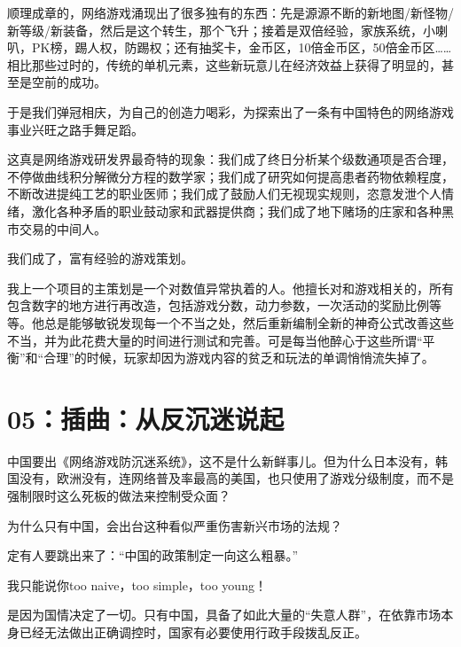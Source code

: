 \documentclass{article}
\begin{document}
顺理成章的，网络游戏涌现出了很多独有的东西：先是源源不断的新地图/新怪物/新等级/新装备，然后是这个转生，那个飞升；接着是双倍经验，家族系统，小喇叭，PK榜，踢人权，防踢权；还有抽奖卡，金币区，10倍金币区，50倍金币区……相比那些过时的，传统的单机元素，这些新玩意儿在经济效益上获得了明显的，甚至是空前的成功。



于是我们弹冠相庆，为自己的创造力喝彩，为探索出了一条有中国特色的网络游戏事业兴旺之路手舞足蹈。



这真是网络游戏研发界最奇特的现象：我们成了终日分析某个级数通项是否合理，不停做曲线积分解微分方程的数学家；我们成了研究如何提高患者药物依赖程度，不断改进提纯工艺的职业医师；我们成了鼓励人们无视现实规则，恣意发泄个人情绪，激化各种矛盾的职业鼓动家和武器提供商；我们成了地下赌场的庄家和各种黑市交易的中间人。



我们成了，富有经验的游戏策划。



我上一个项目的主策划是一个对数值异常执着的人。他擅长对和游戏相关的，所有包含数字的地方进行再改造，包括游戏分数，动力参数，一次活动的奖励比例等等。他总是能够敏锐发现每一个不当之处，然后重新编制全新的神奇公式改善这些不当，并为此花费大量的时间进行测试和完善。可是每当他醉心于这些所谓“平衡”和“合理”的时候，玩家却因为游戏内容的贫乏和玩法的单调悄悄流失掉了。





{\centering\section*{05：插曲：从反沉迷说起}}





中国要出《网络游戏防沉迷系统》，这不是什么新鲜事儿。但为什么日本没有，韩国没有，欧洲没有，连网络普及率最高的美国，也只使用了游戏分级制度，而不是强制限时这么死板的做法来控制受众面？



为什么只有中国，会出台这种看似严重伤害新兴市场的法规？



定有人要跳出来了：“中国的政策制定一向这么粗暴。”



我只能说你too naive，too simple，too young！



是因为国情决定了一切。只有中国，具备了如此大量的“失意人群”，在依靠市场本身已经无法做出正确调控时，国家有必要使用行政手段拨乱反正。
\end{document}

